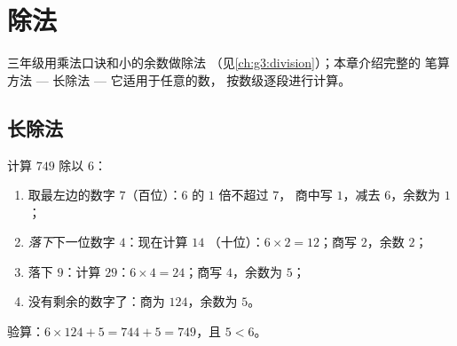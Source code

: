 \chapter{除法}\label{ch:g4:division}

三年级用乘法口诀和小的余数做除法
（见\cref{ch:g3:division}）；本章介绍完整的
笔算方法 --- 长除法 --- 它适用于任意的数，
按数级逐段进行计算。

\section{长除法}

\begin{method}[用一位数做除数的长除法]\label{met:g4:division:method}
计算 $749$ 除以 $6$：
\begin{enumerate}
  \item 取最左边的数字 $7$（百位）：$6$ 的 $1$ 倍不超过 $7$，
        商中写 $1$，减去
        $6$，余数为 $1$；
  \item \emph{落下}下一位数字 $4$：现在计算 $14$
        （十位）：$6 \times 2 = 12$；商写 $2$，余数 $2$；
  \item 落下 $9$：计算 $29$：$6 \times 4 = 24$；商写
        $4$，余数为 $5$；
  \item 没有剩余的数字了：商为 $124$，余数为 $5$。
\end{enumerate}
验算：$6 \times 124 + 5 = 744 + 5 = 749$，且 $5 < 6$。
\end{method}

